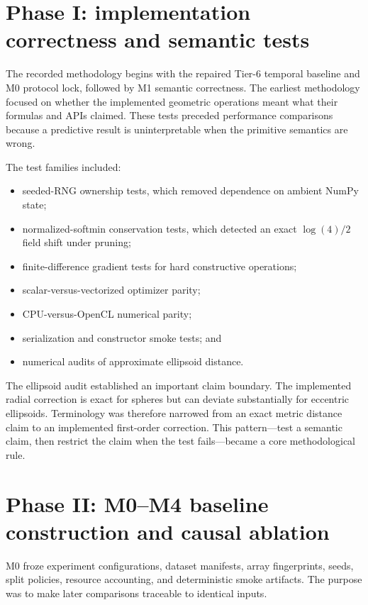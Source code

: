 \documentclass[12pt,oneside]{report}
\begin{document}
\section{Phase I: implementation correctness and semantic tests}

The recorded methodology begins with the repaired Tier-6 temporal baseline and
M0 protocol lock, followed by M1 semantic correctness. The earliest methodology
focused on whether the implemented geometric
operations meant what their formulas and APIs claimed. These tests preceded
performance comparisons because a predictive result is uninterpretable when
the primitive semantics are wrong.

The test families included:

\begin{itemize}
\item seeded-RNG ownership tests, which removed dependence on ambient NumPy
state;
\item normalized-softmin conservation tests, which detected an exact
$\log(4)/2$ field shift under pruning;
\item finite-difference gradient tests for hard constructive operations;
\item scalar-versus-vectorized optimizer parity;
\item CPU-versus-OpenCL numerical parity;
\item serialization and constructor smoke tests; and
\item numerical audits of approximate ellipsoid distance.
\end{itemize}

The ellipsoid audit established an important claim boundary. The implemented
radial correction is exact for spheres but can deviate substantially for
eccentric ellipsoids. Terminology was therefore narrowed from an exact metric
distance claim to an implemented first-order correction. This pattern---test a
semantic claim, then restrict the claim when the test fails---became a core
methodological rule.

\section{Phase II: M0--M4 baseline construction and causal ablation}

M0 froze experiment configurations,
dataset manifests, array fingerprints, seeds, split policies, resource
accounting, and deterministic smoke artifacts. The purpose was to make later
comparisons traceable to identical inputs.
\end{document}
